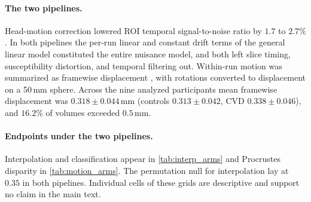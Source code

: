 



\paragraph{The two pipelines.}
Head-motion correction lowered ROI temporal signal-to-noise ratio by $1.7$ to $2.7\%$. In both pipelines the per-run linear and constant drift terms of the general linear model constituted the entire nuisance model, and both left slice timing, susceptibility distortion, and temporal filtering out. Within-run motion was summarized as framewise displacement \parencite{power2012}, with rotations converted to displacement on a 50\,mm sphere. Across the nine analyzed participants mean framewise displacement was $0.318 \pm 0.044$\,mm (controls $0.313 \pm 0.042$, CVD $0.338 \pm 0.046$), and $16.2\%$ of volumes exceeded $0.5$\,mm.

\paragraph{Endpoints under the two pipelines.}
Interpolation and classification appear in \cref{tab:interp_arms} and Procrustes
disparity in \cref{tab:motion_arms}. The permutation null for interpolation lay at
$0.35$ in both pipelines. Individual cells of these grids are descriptive and
support no claim in the main text.

